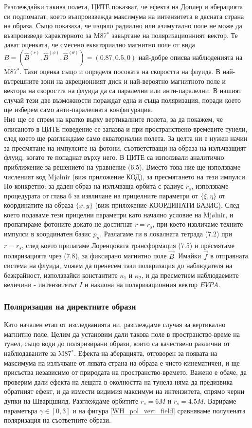 Разглеждайки такива полета, ЦИТЕ показват, че ефекта на Доплер и аберацията си подпомагат, което възпроизвежда максимума на интензитета в дясната страна на образа. Също показаха, че изцяло радиално или азимутално поле не може да възпроизведе характерното за M87$^*$ завъртане на поляризационният вектор. Те дават оценката, че смесено екваториално магнитно поле от вида $B = (\hat{B}^{(r)},\hat{B}^{(\phi)},\hat{B}^{(\theta)}) = (0.87,0.5,0)$ най-добре описва наблюденията на M87$^*$. Тази оценка също и определя посоката на скоростта на флуида. В най-вътрешните зони на акреционният диск и най-вероятно магнитното поле и вектора на скоростта на флуида да са паралелни или анти-паралелни. В нашият случай тези две възможности пораждат една и съща поляризация, поради което ще изберем само анти-паралелната конфигурация.\\

Ние ще се спрем на кратко върху вертикалните полета, за да покажем, че описаното в ЦИТЕ поведение се запазва и при пространствено-времевите тунели, след което ще разглеждаме само екваториални полета. За целта ни е нужен начин за пресмятане на импулсите на фотони, съответстващи на образа на излъчващият флуид, когато те попаднат върху него. В ЦИТЕ са използвали аналитично приближение за решението на уравнение (6.5). Вместо това ние ще използваме численият код Mjølnir (виж приложение КОД), за пресмятането на тези импулси. По-конкретно: за даден образ на излъчваща орбита с радиус $r_s$, използваме процедурата от глава 6 за извличане на прицелните параметри от $\{\xi,\eta\}$ от координатите на образа $\{x, y\}$ (виж приложение КООРДИНАТИ БАЗИС). След което подаваме тези прицелни параметри като начално условие на Mjølnir, и пропагираме фотоните докато не достигнат $r = r_s$, при което извличаме техните импулси в координатен базис $p_\mu$. Разлагаме ги в локалната тетрада (7.2) при $r = r_s$, след което прилагаме Лоренцовата трансформация (7.5) и пресмятаме поляризацията чрез (7.8), за фиксирано магнитно поле $\vec{B}$. Имайки $\vec{f}$ в отправната система на флуида, можем да пренесем тази поляризация до наблюдателя на безкрайност, използвайки константите $\kappa_1$ и $\kappa_2$, и да пресметнем наблюдаемите величини - интензитетът $I$ и наклона на поляризационния вектор $EVPA$.
\subsubsection{Поляризация на директните образи}
Като начален етап от изследванията ни, разглеждаме случая за вертикално магнитно поле. Целим да установим дали такова поле в пространство-време на тунел, също води до поляризирани образи, които са качествено различни от наблюдаваните за M87$^*$. Ефекта на аберацията, отговорен за появата на максимума на излъчване от лявата страна на образа е чисто кинематичен, и ще присъства независимо от природата на пространство-времето. Важено е обаче, да проверим дали ефекта на лещата в околността на тунела няма да предизвика обратният ефект, и да измести видимия максимум на интензитета, спрямо черни дупки на Шварцшилд. Разглеждаме орбитите $r_s = 6M$ и $r_s = 4.5M$. Варираме параметъра $\gamma\in[0,3]$ и на фигура \ref{WH_pol_vert_field} сравняваме получената поляризация на съответните образи.\\

